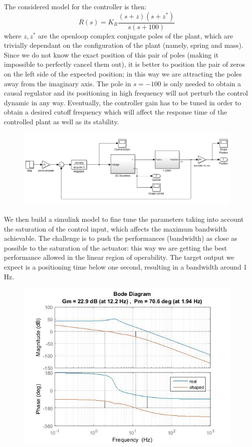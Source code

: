 The considered model for the controller is then:
\begin{equation}
R(s) = K_R\frac{(s+z)(s+z^*)}{s(s+100)}
\end{equation}
where $z,z^*$ are the openloop complex conjugate poles of the plant, which are trivially dependant on the configuration of the plant (namely, spring and mass). Since we do not know the exact position of this pair of poles (making it impossible to perfectly cancel them out), it is better to position the pair of zeros on the left side of the expected position; in this way we are attracting the poles away from the imaginary axis. The pole in $s=-100$ is only needed to obtain a causal regulator and its positioning in high frequency will not perturb the control dynamic in any way. Eventually, the controller gain has to be tuned in order to obtain a desired cutoff frequency which will affect the response time of the controlled plant as well as its stability. \\

\begin{figure}
\includegraphics[width=\textwidth]{img/simulink_ls.png}
\end{figure}

We then build a simulink model to fine tune the parameters taking into account the saturation of the control input, which affects the maximum bandwidth achievable. The challenge is to push the performances (bandwidth) as close as possible to the saturation of the actuator: this way we are getting the best performance allowed in the linear region of operability. The target output we expect is a positioning time below one second, resulting in a bandwidth around 1 Hz.

\begin{figure}[h]
\includegraphics[width=\textwidth]{img/bode_shaping.jpg}
\end{figure}

